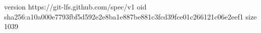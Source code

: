 version https://git-lfs.github.com/spec/v1
oid sha256:a10a000e7793fbf5d592e2e8ba1e887be881c3fcd39fce01c266121c06e2eef1
size 1039
